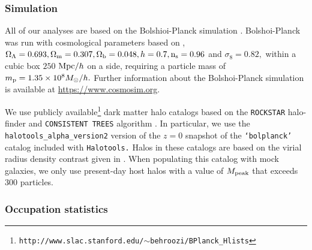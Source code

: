 \documentclass[usenatbib,usegraphicx,letterpaper]{mn2e}
\begin{document}
\subsubsection{Simulation}

All of our analyses are based on the Bolshioi-Planck simulation \citep{riebe_etal11}. 
Bolshoi-Planck was run with cosmological parameters based on \citet{planck13}, $\Omega_{\Lambda} = 0.693, \Omega_{\rm m} = 0.307, \Omega_{\rm b} = 0.048, h = 0.7, {\rm n_s}=0.96$ and $\sigma_8 = 0.82,$ within a cubic box 
$250$ ${\rm Mpc}/h$ on a side, requiring a particle mass of $m_{\rm p} = 1.35\times10^{8}M_{\odot}/h.$ 
Further information about the Bolshoi-Planck simulation is available at \url{https://www.cosmosim.org}. 

We use publicly available\footnote{\tt http://www.slac.stanford.edu/$\sim$behroozi/BPlanck\_Hlists} dark matter 
halo catalogs based on the {\tt ROCKSTAR} halo-finder \citep{behroozi_rockstar11} and {\tt CONSISTENT TREES} algorithm \citep{behroozi_trees13}. In particular, we use the {\tt halotools\_alpha\_version2} version of the $z=0$ snapshot 
of the {\tt `bolplanck'} catalog included with {\tt Halotools.} Halos in these catalogs are based on the virial radius 
density contrast given in \citet{bryan_norman98}. When populating this catalog with mock galaxies, we only use 
present-day host halos with a value of $M_{\rm peak}$ that exceeds $300$ particles. 


\subsubsection{Occupation statistics}
\end{document}
